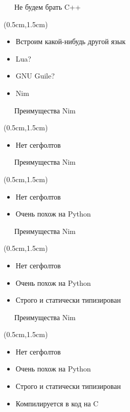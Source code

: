 \documentclass[xetex,18pt,aspectratio=43]{beamer}
\begin{document}
\begin{Large}
\begin{frame}{\ \ \ Не будем брать C++}
\begin{textblock*}{\framewidth-0.8cm}(0.5cm,1.5cm)
\begin{itemize}
  \item Встроим какой-нибудь другой язык
  \item Lua?
  \item GNU Guile?
  \item Nim
\end{itemize}
\end{textblock*}
\end{frame}

\begin{frame}{\ \ \ Преимущества Nim}
\begin{textblock*}{\framewidth-0.8cm}(0.5cm,1.5cm)
\begin{itemize}
  \item Нет сегфолтов
\end{itemize}
\end{textblock*}
\end{frame}

\begin{frame}{\ \ \ Преимущества Nim}
\begin{textblock*}{\framewidth-0.8cm}(0.5cm,1.5cm)
\begin{itemize}
  \item Нет сегфолтов
  \item Очень похож на Python
\end{itemize}
\end{textblock*}
\end{frame}

\begin{frame}{\ \ \ Преимущества Nim}
\begin{textblock*}{\framewidth-0.8cm}(0.5cm,1.5cm)
\begin{itemize}
  \item Нет сегфолтов
  \item Очень похож на Python
  \item Строго и статически типизирован
\end{itemize}
\end{textblock*}
\end{frame}

\begin{frame}{\ \ \ Преимущества Nim}
\begin{textblock*}{\framewidth-0.8cm}(0.5cm,1.5cm)
\begin{itemize}
  \item Нет сегфолтов
  \item Очень похож на Python
  \item Строго и статически типизирован
  \item Компилируется в код на C
\end{itemize}
\end{textblock*}
\end{frame}


\end{Large}
\end{document}
